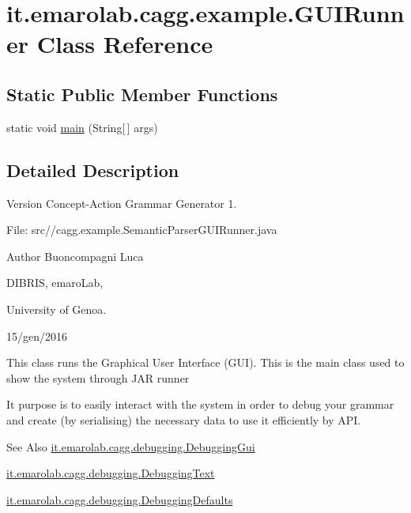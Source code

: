\hypertarget{classit_1_1emarolab_1_1cagg_1_1example_1_1GUIRunner}{\section{it.\-emarolab.\-cagg.\-example.\-G\-U\-I\-Runner Class Reference}
\label{classit_1_1emarolab_1_1cagg_1_1example_1_1GUIRunner}
}
\subsection*{Static Public Member Functions}
\begin{DoxyCompactItemize}
\item 
static void \hyperlink{classit_1_1emarolab_1_1cagg_1_1example_1_1GUIRunner_a4813888fcbec6bce50805a35d495cd6f}{main} (String\mbox{[}$\,$\mbox{]} args)
\end{DoxyCompactItemize}


\subsection{Detailed Description}
\begin{DoxyVersion}{Version}
Concept-\/\-Action Grammar Generator 1. \par
 File\-: src//cagg.example.\-Semantic\-Parser\-G\-U\-I\-Runner.\-java \par

\end{DoxyVersion}
\begin{DoxyAuthor}{Author}
Buoncompagni Luca \par
 D\-I\-B\-R\-I\-S, emaro\-Lab,\par
 University of Genoa. \par
 15/gen/2016 \par

\end{DoxyAuthor}


This class runs the Graphical User Interface (G\-U\-I). This is the main class used to show the system through J\-A\-R runner 

It purpose is to easily interact with the system in order to debug your grammar and create (by serialising) the necessary data to use it efficiently by A\-P\-I.\par
 

\begin{DoxySeeAlso}{See Also}
\hyperlink{classit_1_1emarolab_1_1cagg_1_1debugging_1_1DebuggingGui}{it.\-emarolab.\-cagg.\-debugging.\-Debugging\-Gui} 

\hyperlink{classit_1_1emarolab_1_1cagg_1_1debugging_1_1DebuggingText}{it.\-emarolab.\-cagg.\-debugging.\-Debugging\-Text} 

\hyperlink{classit_1_1emarolab_1_1cagg_1_1debugging_1_1DebuggingDefaults}{it.\-emarolab.\-cagg.\-debugging.\-Debugging\-Defaults} 
\end{DoxySeeAlso}


